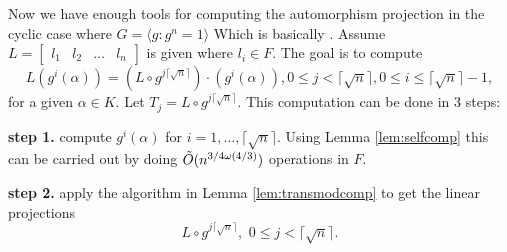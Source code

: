 Now we have enough tools for computing the automorphism projection in the cyclic case where $G = \langle g: g^n =1 \rangle$
Which is basically \cite[Algorithm AP]{Kaltofen}. 
Assume $L = \begin{bmatrix}
l_1 & l_2 & \ldots & l_n
\end{bmatrix}$ is given where $l_i \in F$. The goal is to compute 
\begin{equation}\label{eq:autproj}
L(g^i(\alpha)) = (L \circ g^{j \lceil \sqrt{n} \rceil})\cdot (g^i(\alpha)), 0 \leq j < \lceil \sqrt{n} \rceil, 0 \leq i \leq \lceil \sqrt{n} \rceil -1, 
\end{equation}
for a given $\alpha \in K$. 
Let $T_j = L\circ g^{j \lceil \sqrt{n} \rceil}$.
This computation can be done in 3 steps:

\textbf{step 1.} compute $g^i(\alpha)$ for $i = 1, \ldots , \lceil \sqrt{n} \rceil$. Using Lemma \ref{lem:selfcomp} this 
can be carried out by doing $\tilde{O}(n^{3/4 \omega(4/3)})$ operations in $F$.

\textbf{step 2.} apply the algorithm in Lemma \ref{lem:transmodcomp} to get the linear projections 
$$L \circ g^{j \lceil \sqrt{n} \rceil}, \,\, 0 \leq j < \lceil \sqrt{n} \rceil.$$ 

